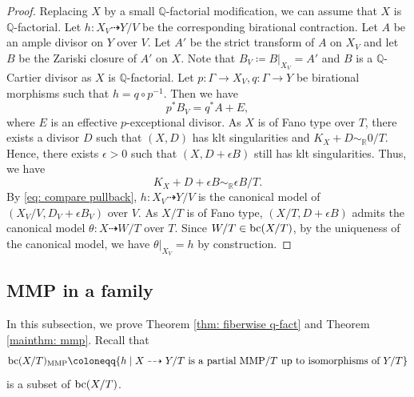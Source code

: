 \documentclass[11pt,oneside,reqno]{amsart}
\numberwithin{equation}{section}
\theoremstyle{definition}
\newcommand{\bc}{{\rm {bc}}}
\newcommand{\dto}{\dashrightarrow}
\newcommand{\bQ}{\mathbb{Q}}
\newcommand{\bR}{\mathbb{R}}
\begin{document}
\begin{proof}
Replacing $X$ by a small $\bQ$-factorial modification, we can assume that $X$ is $\bQ$-factorial. Let $h: X_V \dto Y/V$ be the corresponding birational contraction. Let $A$ be an ample divisor on $Y$ over $V$. Let $A'$ be the strict transform of $A$ on $X_V$ and let $B$ be the Zariski closure of $A'$ on $X$. Note that $B_V\coloneqq B|_{X_V}=A'$ and $B$ is a $\bQ$-Cartier divisor as $X$ is $\bQ$-factorial. Let $p: \Gamma \to X_V, q: \Gamma \to Y$ be birational morphisms such that $h=q\circ p^{-1}$. Then we have
\begin{equation}\label{eq: compare pullback}
p^*B_V=q^*A+E,
\end{equation} where $E$ is an effective $p$-exceptional divisor. As $X$ is of Fano type over $T$, there exists a divisor $D$ such that $(X,D)$ has klt singularities and $K_X+D \sim_\bR 0/T$. Hence, there exists $\epsilon>0$ such that $(X,D+\epsilon B)$ still has klt singularities. Thus, we have
\[
K_X+D+\epsilon B \sim_\bR \epsilon B/T.
\]
By \eqref{eq: compare pullback}, $h: X_V \dto Y/V$ is the canonical model of $(X_V/V, D_V+\epsilon B_V)$ over $V$. As $X/T$ is of Fano type, $(X/T, D+\epsilon B)$ admits the canonical model $\theta: X \dto W/T$ over $T$. Since $W/T \in \bc(X/T)$, by the uniqueness of the canonical model, we have $\theta|_{X_V} = h$ by construction.
\end{proof}


\subsection{MMP in a family}
In this subsection, we prove Theorem \ref{thm: fiberwise q-fact} and Theorem \ref{mainthm: mmp}. Recall that
\[
\bc(X/T)_{\rm MMP}\coloneqq \{h \mid X \dasharrow Y/T \text{~is a partial~}\text{MMP}/T \text{~up to isomorphisms of~} Y/T\}
\] is a subset of $\bc(X/T)$.
\end{document}
